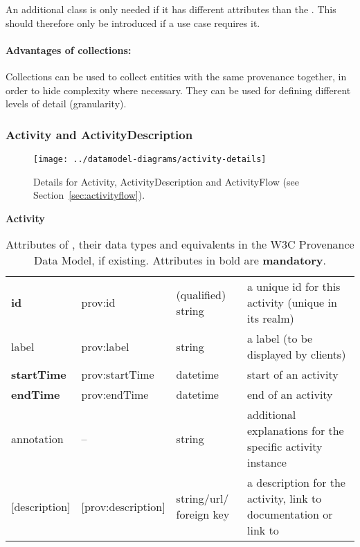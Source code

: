 An additional class  is only 
needed if it has different attributes than 
the . This should therefore only be introduced if a use case requires it.

\paragraph{Advantages of collections:} Collections can be used to collect entities with the same provenance together, 
    in order to hide complexity where necessary. They can be used for defining 
    different levels of detail (granularity).





\subsubsection{Activity and ActivityDescription}

\begin{figure}[h]
\centering
\texttt{[image: ../datamodel-diagrams/activity-details]}
\caption{Details for Activity, ActivityDescription and ActivityFlow (see Section~\ref{sec:activityflow}). 
}
\label{fig:activity-details}
\end{figure}



\begin{table}[h]

\small
{}\textwidth

\textbf{\normalsize Activity}\vspace{0.25em}\\
\begin{tabulary}{1.0\textwidth}{@{}lp{2.5cm}p{2cm}L@{}}
\toprule
{} &  &  & \\
\midrule
\textbf{id} & prov:id  & (qualified) string & a unique id for this activity (unique in its realm)\\
label        & prov:label  & string & a label (to be displayed by clients)\\
\textbf{startTime} & prov:startTime & datetime & start of an activity\\
\textbf{endTime} & prov:endTime  & datetime & end of an activity\\
annotation        & --  & string & additional explanations for the specific activity instance\\
{[description]}  & [prov:description] & string/url/ foreign key & a description for the activity, 
                link to documentation or link to \\
\bottomrule
\end{tabulary}
\caption{Attributes of , their data types and equivalents in the W3C Provenance 
Data Model, if existing. Attributes in bold are \textbf{mandatory}.}
\end{table}



